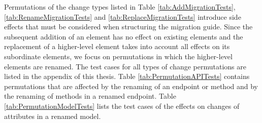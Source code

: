 \vspace{-0.5cm}
Permutations of the change types listed in Table \ref{tab:AddMigrationTests}, \ref{tab:RenameMigrationTests} and \ref{tab:ReplaceMigrationTests} introduce side effects that must be considered when structuring the migration guide. Since the subsequent addition of an element has no effect on existing elements and the replacement of a higher-level element takes into account all effects on its subordinate elements, we focus on permutations in which the higher-level elements are renamed. The test cases for all types of change permutations are listed in the appendix of this thesis. Table \ref{tab:PermutationAPITests} contains permutations that are affected by the renaming of an endpoint or method and by the renaming of methods in a renamed endpoint. Table \ref{tab:PermutationModelTests} lists the test cases of the effects on changes of attributes in a renamed model. 

